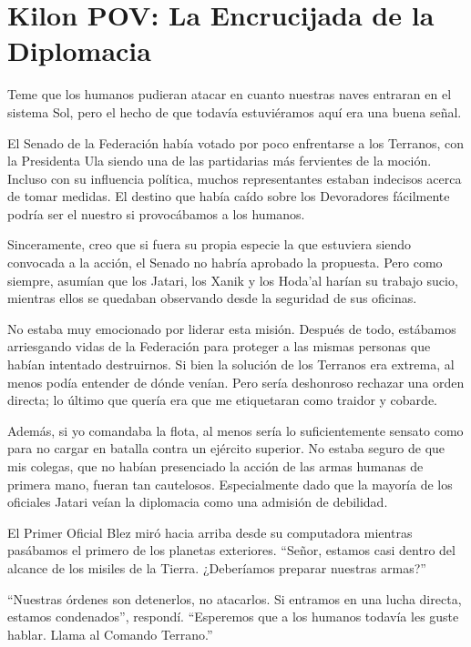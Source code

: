 \documentclass[spanish,12pt,a4paper,oneside,titlepage]{book}
\begin{document}
    \chapter{Kilon POV: La Encrucijada de la Diplomacia}

    Teme que los humanos pudieran atacar en cuanto nuestras naves entraran en el sistema Sol, pero el hecho de que todavía estuviéramos aquí era una buena señal.

    El Senado de la Federación había votado por poco enfrentarse a los Terranos, con la Presidenta Ula siendo una de las partidarias más fervientes de la moción. Incluso con su influencia política, muchos representantes estaban indecisos acerca de tomar medidas. El destino que había caído sobre los Devoradores fácilmente podría ser el nuestro si provocábamos a los humanos.

    Sinceramente, creo que si fuera su propia especie la que estuviera siendo convocada a la acción, el Senado no habría aprobado la propuesta. Pero como siempre, asumían que los Jatari, los Xanik y los Hoda’al harían su trabajo sucio, mientras ellos se quedaban observando desde la seguridad de sus oficinas.

    No estaba muy emocionado por liderar esta misión. Después de todo, estábamos arriesgando vidas de la Federación para proteger a las mismas personas que habían intentado destruirnos. Si bien la solución de los Terranos era extrema, al menos podía entender de dónde venían. Pero sería deshonroso rechazar una orden directa; lo último que quería era que me etiquetaran como traidor y cobarde.

    Además, si yo comandaba la flota, al menos sería lo suficientemente sensato como para no cargar en batalla contra un ejército superior. No estaba seguro de que mis colegas, que no habían presenciado la acción de las armas humanas de primera mano, fueran tan cautelosos. Especialmente dado que la mayoría de los oficiales Jatari veían la diplomacia como una admisión de debilidad.

    El Primer Oficial Blez miró hacia arriba desde su computadora mientras pasábamos el primero de los planetas exteriores. “Señor, estamos casi dentro del alcance de los misiles de la Tierra. ¿Deberíamos preparar nuestras armas?”

    “Nuestras órdenes son detenerlos, no atacarlos. Si entramos en una lucha directa, estamos condenados”, respondí. “Esperemos que a los humanos todavía les guste hablar. Llama al Comando Terrano.”
\end{document}
